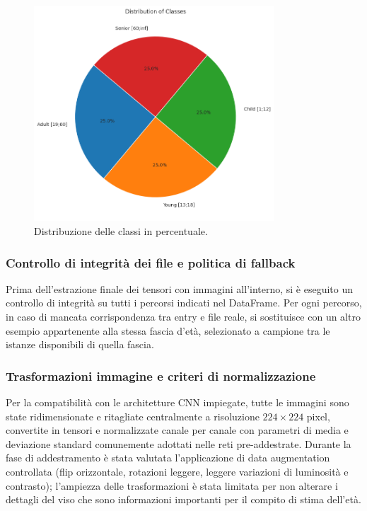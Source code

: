 \documentclass[a4paper,12pt]{report}
\begin{document}
	\begin{figure}[H]
		\centering
		\includegraphics[width=0.8\textwidth]{img/pie_agegroup_image.png}
		\caption{Distribuzione delle classi in percentuale.}
	\end{figure}
	
	\subsubsection{Controllo di integrità dei file e politica di fallback}
	Prima dell'estrazione finale dei tensori con immagini all'interno, si è eseguito un controllo di integrità su tutti i percorsi indicati nel DataFrame. Per ogni percorso, in caso di mancata corrispondenza tra entry e file reale, si sostituisce con un altro esempio appartenente alla stessa fascia d'età, selezionato a campione tra le istanze disponibili di quella fascia.
	
	\subsubsection{Trasformazioni immagine e criteri di normalizzazione}
	Per la compatibilità con le architetture CNN impiegate, tutte le immagini sono state ridimensionate e ritagliate centralmente a risoluzione \(224\times224\) pixel, convertite in tensori e normalizzate canale per canale con parametri di media e deviazione standard comunemente adottati nelle reti pre-addestrate. Durante la fase di addestramento è stata valutata l'applicazione di data augmentation controllata (flip orizzontale, rotazioni leggere, leggere variazioni di luminosità e contrasto); l'ampiezza delle trasformazioni è stata limitata per non alterare i dettagli del viso che sono informazioni importanti per il compito di stima dell'età.
	
\end{document}
